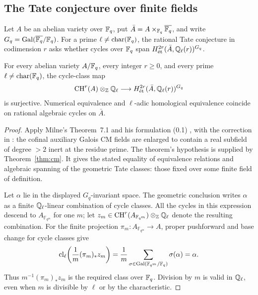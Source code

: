\subsection{The Tate conjecture over finite fields}

Let \(A\) be an abelian variety over \(\mathbb{F}_q\), put
\(\bar A=A\times_{\mathbb{F}_q}\overline{\mathbb{F}_q}\), and write
\(G_q=\operatorname{Gal}(\overline{\mathbb{F}_q}/\mathbb{F}_q)\). For a prime
\(\ell\ne\operatorname{char}(\mathbb{F}_q)\), the rational Tate conjecture in
codimension \(r\) asks whether cycles over \(\mathbb{F}_q\) span
\(H^{2r}_{\mathrm{\acute et}}(\bar A,\mathbb{Q}_\ell(r))^{G_q}\).

\begin{corollary}
\label{cc:tate}
For every abelian variety \(A/\mathbb{F}_q\), every integer \(r\ge0\), and every
prime \(\ell\ne\operatorname{char}(\mathbb{F}_q)\), the cycle-class map
\[
 \operatorname{CH}^r(A)\otimes_{\mathbb{Z}}\mathbb{Q}_\ell\longrightarrow
 H^{2r}_{\mathrm{\acute et}}(\bar A,\mathbb{Q}_\ell(r))^{G_q}
\]
is surjective. Numerical equivalence and \(\ell\)-adic homological
equivalence coincide on rational algebraic cycles on \(\bar A\).
\end{corollary}

\begin{proof}
Apply Milne's Theorem~7.1 and his formulation (0.1)
\cite{Milne1999Tate}, with the correction in
\cite{cc:Milne1999Addenda}: the cofinal auxiliary Galois CM fields
are enlarged to contain a real subfield of degree \(>2\) inert at
the residue prime. The theorem's hypothesis is supplied by
Theorem~\ref{thm:cm}. It gives the stated equality of
equivalence relations and algebraic spanning of the geometric Tate
classes: those fixed over some finite field of definition.

Let \(\alpha\) lie in the displayed \(G_q\)-invariant space. The
geometric conclusion writes \(\alpha\) as a finite
\(\mathbb{Q}_\ell\)-linear combination of cycle classes. All the cycles in
this expression descend to \(A_{\mathbb F_{q^m}}\) for one \(m\);
let \(z_m\in\operatorname{CH}^r(A_{\mathbb F_{q^m}})\otimes_{\mathbb{Z}}\mathbb{Q}_\ell\) denote
the resulting combination. For the finite projection
\(\pi_m:A_{\mathbb F_{q^m}}\to A\), proper pushforward and base
change for cycle classes give
\[
 \operatorname{cl}_\ell\!\left(\frac1m(\pi_m)_*z_m\right)
 =\frac1m\sum_{\sigma\in
        \operatorname{Gal}(\mathbb F_{q^m}/\mathbb{F}_q)}\sigma(\alpha)=\alpha.
\]
Thus \(m^{-1}(\pi_m)_*z_m\) is the required class over \(\mathbb{F}_q\).
Division by \(m\) is valid in \(\mathbb{Q}_\ell\), even when \(m\) is
divisible by \(\ell\) or by the characteristic.
\end{proof}

